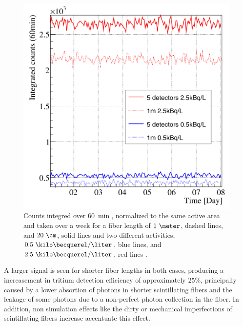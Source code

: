 \begin{figure}[h]
\centering
\includegraphics[scale=0.3]{Figures/8SimulationsResults/81TRITIUMDesign/813Length/2DifferentLength.png}
\caption{Counts integred over $60~\min$, normalized to the same active area and taken over a week for a fiber length of $1~\meter$, dashed lines, and $20~\cm$, solid lines and two different activities, $0.5~\kilo\becquerel/\liter$, blue lines, and $2.5~\kilo\becquerel/\liter$, red lines \cite{SimulationPaperCarlos}. \label{fig:CountsOver60minDifferentLength}}
\end{figure}

A larger signal is seen for shorter fiber lengths in both cases, producing a increasement in tritium detection efficiency of approximately $25\%$, principally caused by a lower absortion of photons in shorter scintillating fibers and the leakage of some photons due to a non-perfect photon collection in the fiber. In addition, non simulation effects like the dirty or mechanical imperfections of scintillating fibers increase accentuate this effect.